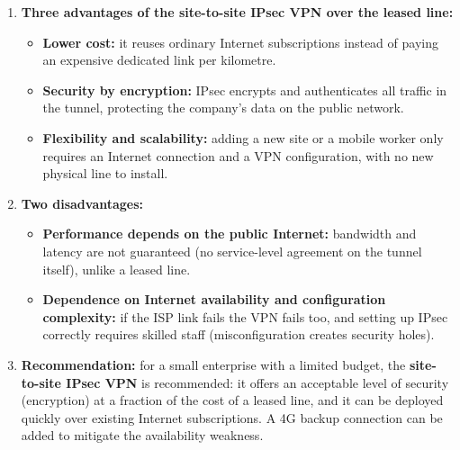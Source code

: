 \documentclass[11pt]{article}
\begin{document}
\begin{corrige}
\begin{enumerate}
\item \textbf{Three advantages of the site-to-site IPsec VPN over the leased line:}
\begin{itemize}
\item \textbf{Lower cost:} it reuses ordinary Internet subscriptions instead of paying an expensive dedicated link per kilometre.
\item \textbf{Security by encryption:} IPsec encrypts and authenticates all traffic in the tunnel, protecting the company's data on the public network.
\item \textbf{Flexibility and scalability:} adding a new site or a mobile worker only requires an Internet connection and a VPN configuration, with no new physical line to install.
\end{itemize}
\item \textbf{Two disadvantages:}
\begin{itemize}
\item \textbf{Performance depends on the public Internet:} bandwidth and latency are not guaranteed (no service-level agreement on the tunnel itself), unlike a leased line.
\item \textbf{Dependence on Internet availability and configuration complexity:} if the ISP link fails the VPN fails too, and setting up IPsec correctly requires skilled staff (misconfiguration creates security holes).
\end{itemize}
\item \textbf{Recommendation:} for a small enterprise with a limited budget, the \textbf{site-to-site IPsec VPN} is recommended: it offers an acceptable level of security (encryption) at a fraction of the cost of a leased line, and it can be deployed quickly over existing Internet subscriptions. A 4G backup connection can be added to mitigate the availability weakness.
\end{enumerate}
\end{corrige}
\end{document}
